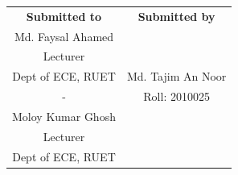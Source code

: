 \begin{center}
    \begin{tabular}{c|c}
        \textbf{Submitted to} & \textbf{Submitted by} \\
        Md. Faysal Ahamed     &                       \\
        Lecturer              &                       \\
        Dept of ECE, RUET     & Md. Tajim An Noor     \\
        -                     & Roll: 2010025         \\
        Moloy Kumar Ghosh     &                       \\
        Lecturer              &                       \\
        Dept of ECE, RUET     &                       \\
    \end{tabular}

\end{center}
\vspace*{\fill}
